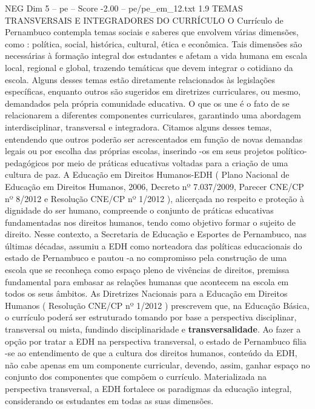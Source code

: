 \begin{textsample}{NEG Dim 5 – pe – Score -2.00 – pe/pe\_em\_12.txt}  \label{ex:f5_neg_082}
1.9 TEMAS TRANSVERSAIS E INTEGRADORES DO CURRÍCULO O Currículo de Pernambuco contempla temas sociais e saberes que envolvem várias dimensões, como : política, social, histórica, cultural, ética e econômica.
Tais dimensões são necessárias à formação integral dos estudantes e afetam a vida humana em escala local, regional e global, trazendo temáticas que devem integrar o cotidiano da escola.
Alguns desses temas estão diretamente relacionados às legislações específicas, enquanto outros são sugeridos em diretrizes curriculares, ou mesmo, demandados pela própria comunidade educativa.
O que os une é o fato de se relacionarem a diferentes componentes curriculares, garantindo uma abordagem interdisciplinar, transversal e integradora.
Citamos alguns desses temas, entendendo que outros poderão ser acrescentados em função de novas demandas legais ou por escolha das próprias escolas, inserindo -os em seus projetos político-pedagógicos por meio de práticas educativas voltadas para a criação de uma cultura de paz.
A Educação em Direitos Humanos-EDH ( Plano Nacional de Educação em Direitos Humanos, 2006, Decreto nº 7.037/2009, Parecer CNE/CP nº 8/2012 e Resolução CNE/CP nº 1/2012 ), alicerçada no respeito e proteção à dignidade do ser humano, compreende o conjunto de práticas educativas fundamentadas nos direitos humanos, tendo como objetivo formar o sujeito de direito.
Nesse contexto, a Secretaria de Educação e Esportes de Pernambuco, nas últimas décadas, assumiu a EDH como norteadora das políticas educacionais do estado de Pernambuco e pautou -a no compromisso pela construção de uma escola que se reconheça como espaço pleno de vivências de direitos, premissa fundamental para embasar as relações humanas que acontecem na escola em todos os seus âmbitos.
As Diretrizes Nacionais para a Educação em Direitos Humanos ( Resolução CNE/CP nº 1/2012 ) prescrevem que, na Educação Básica, o currículo poderá ser estruturado tomando por base a perspectiva disciplinar, transversal ou mista, fundindo disciplinaridade e \textbf{transversalidade}.
Ao fazer a opção por tratar a EDH na perspectiva transversal, o estado de Pernambuco filia -se ao entendimento de que a cultura dos direitos humanos, conteúdo da EDH, não cabe apenas em um componente curricular, devendo, assim, ganhar espaço no conjunto dos componentes que compõem o currículo.
Materializada na perspectiva transversal, a EDH fortalece os paradigmas da educação integral, considerando os estudantes em todas as suas dimensões.

\end{textsample}
